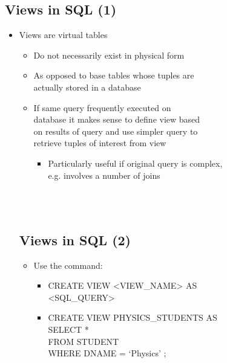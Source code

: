 \documentclass[12pt]{article}
\begin{document}
\begin{itemize}
\begin{itemize}
\begin{itemize}
\section{Views in SQL (1)}
\begin{itemize}
  \item Views are virtual tables\\ 
\begin{itemize}
  \item Do not necessarily exist in physical form\\ 
  \item As opposed to base tables whose tuples are \\ 
actually stored in a database\\ 
\end{itemize}
\begin{itemize}
  \item If same query frequently executed on \\ 
database it makes sense to define view based \\ 
on results of query and use simpler query to \\ 
retrieve tuples of interest from view\\ 
\begin{itemize}
  \item Particularly useful if original query is complex,\\ 
e.g. involves a number of joins\\ 
\end{itemize}
\end{itemize}
\\ 
 \\ 
\section{Views in SQL (2)}
\begin{itemize}
  \item Use the command:\\ 
\begin{itemize}
  \item CREATE VIEW <VIEW_NAME> AS\\ 
<SQL_QUERY>\\ 
  \item CREATE VIEW PHYSICS_STUDENTS AS\\ 
SELECT *\\ 
FROM STUDENT\\ 
WHERE   DNAME = ‘Physics’ ;\\ 
\end{itemize}
\end{itemize}
\\ 
 \\ 

\end{itemize}
\end{itemize}
\end{itemize}
\end{itemize}
\end{document}
